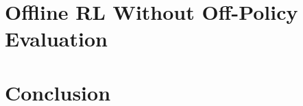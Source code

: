 \chapter{Offline RL Without Off-Policy Evaluation} \label{sec:offline-rl}


\chapter{Conclusion} \label{sec:conclusion}









% 



